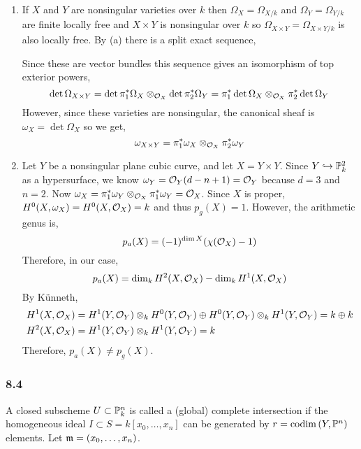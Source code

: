 \documentclass[12pt]{article}
\begin{document}
\begin{enumerate}
\item If $X$ and $Y$ are nonsingular varieties over $k$ then $\Omega_{X} = \Omega_{X/k}$ and $\Omega_{Y} = \Omega_{Y/k}$ are finite locally free and $X \times Y$ is nonsingular over $k$ so $\Omega_{X \times Y} = \Omega_{X \times Y / k}$ is also locally free. By (a) there is a split exact sequence,
\begin{center}
\end{center}
Since these are vector bundles this sequence gives an isomorphism of top exterior powers,
\[ \det{\Omega_{X \times Y}} = \det{\pi_1^* \Omega_X} \otimes_{\struct{X}} \det{\pi_2^* \Omega_Y} = \pi_1^* \det{\Omega_X} \otimes_{\struct{X}} \pi_2^* \det{\Omega_Y} \]
However, since these varieties are nonsingular, the canonical sheaf is $\omega_X = \det{\Omega_X}$ so we get,
\[ \omega_{X \times Y} = \pi_1^* \omega_X \otimes_{\struct{X}} \pi_2^* \omega_Y \]

\item Let $Y$ be a nonsingular plane cubic curve, and let $X = Y \times Y$. Since $Y \embed \P^2_k$ as a hypersurface, we know $\omega_Y = \struct{Y}(d - n + 1) = \struct{Y}$ because $d = 3$ and $n = 2$.  Now $\omega_X = \pi_1^* \omega_Y \otimes_{\struct{X}} \pi_1^* \omega_Y = \struct{X}$. Since $X$ is proper, $H^0(X, \omega_X) = H^0(X, \struct{X}) = k$ and thus $p_g(X) = 1$. However, the arithmetic genus is,
\[ p_a(X) = (-1)^{\dim{X}} (\chi(\struct{X}) - 1) \]
Therefore, in our case,
\[ p_a(X) = \dim_k H^2(X, \struct{X}) - \dim_k H^1(X, \struct{X}) \]
By K\"{u}nneth,
\begin{align*}
H^1(X, \struct{X}) & = H^1(Y, \struct{Y}) \otimes_k H^0(Y, \struct{Y}) \oplus H^0(Y, \struct{Y}) \otimes_k H^1(Y, \struct{Y}) = k \oplus k 
\\
H^2(X, \struct{X}) & = H^1(Y, \struct{Y}) \otimes_k H^1(Y, \struct{Y}) = k 
\end{align*}
Therefore, $p_a(X) \neq p_g(X)$.
\end{enumerate}


\subsubsection{8.4}

A closed subscheme $U \subset \P^n_k$ is called a (global) complete intersection if the homogeneous ideal $I \subset S = k[x_0, \dots, x_n]$ can be generated by $r = \codim{Y, \P^n}$ elements. Let $\m = (x_0, \dots, x_n)$.
\end{document}
